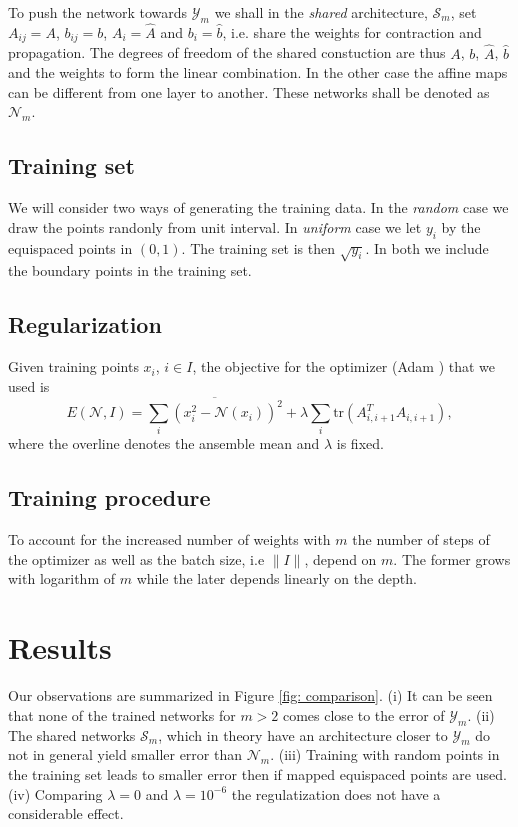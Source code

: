 \documentclass[onetab, a4paper]{siamart171218}
\newcommand{\norm}[1]{\lVert#1\rVert}
\theoremstyle{remark}
\begin{document}
To push the network towards $\mathcal{Y}_m$ we shall in the \emph{shared}
architecture, $\mathcal{S}_m$, set $A_{ij}=A$, $b_{ij}=b$, $A_{i}=\hat{A}$ and $b_{i}=\hat{b}$,
i.e. share the weights for contraction and propagation. The degrees of freedom
of the shared constuction are thus $A$, $b$, $\hat{A}$, $\hat{b}$ and the weights
to form the linear combination. In the other case the affine maps can be
different from one layer to another. These networks shall be denoted as
$\mathcal{N}_m$.

\subsection{Training set} We will consider two ways of generating the training
data. In the \emph{random} case we draw the points randonly from unit interval.
In \emph{uniform} case we let $y_i$ by the equispaced points in $(0, 1)$. The
training set is then $\sqrt{y_i}$. In both we include the boundary points in the
training set.

\subsection{Regularization} Given training points $x_i$, $i\in I$, the
objective for the optimizer (Adam \cite{kingma2014adam}) that we used is
\[
E(\mathcal{N}, I) = \overline{\sum_i(x^2_i - \mathcal{N}(x_i))^2} + \lambda \sum_{i}\text{tr}(A^T_{i, i+1} A_{i, i+1}),
\]
where the overline denotes the ansemble mean and $\lambda$ is fixed.

\subsection{Training procedure} To account for the increased number of
weights with $m$ the number of steps of the optimizer as well as the batch
size, i.e $\norm{I}$, depend on $m$. The former grows with logarithm of
$m$ while the later depends linearly on the depth.

\section{Results} Our observations are summarized in Figure \ref{fig: comparison}.
(i) It can be seen that none of the trained networks for $m>2$ comes close to the
error of $\mathcal{Y}_m$. (ii) The shared networks $\mathcal{S}_m$, which
in theory have an architecture closer to $\mathcal{Y}_m$ do not in general yield
smaller error than $\mathcal{N}_m$. (iii) Training with random points in the training
set leads to smaller error then if mapped equispaced points are used. (iv) Comparing
$\lambda=0$ and $\lambda=10^{-6}$ the regulatization does not have a considerable
effect.
\end{document}
